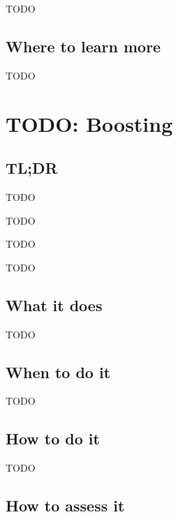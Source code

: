 \documentclass[
]{book}
\providecommand{\tightlist}{%
  \setlength{\itemsep}{0pt}\setlength{\parskip}{0pt}}
\begin{document}
TODO

\hypertarget{where-to-learn-more-17}{%
\section{Where to learn more}\label{where-to-learn-more-17}}

TODO

\hypertarget{boosting}{%
\chapter{TODO: Boosting}\label{boosting}}

\hypertarget{tldr-18}{%
\section{TL;DR}\label{tldr-18}}

\begin{description}
\tightlist
\item[What it does]
TODO
\item[When to do it]
TODO
\item[How to do it]
TODO
\item[How to assess it]
TODO
\end{description}

\hypertarget{what-it-does-18}{%
\section{What it does}\label{what-it-does-18}}

TODO

\hypertarget{when-to-do-it-18}{%
\section{When to do it}\label{when-to-do-it-18}}

TODO

\hypertarget{how-to-do-it-18}{%
\section{How to do it}\label{how-to-do-it-18}}

TODO

\hypertarget{how-to-assess-it-18}{%
\section{How to assess it}\label{how-to-assess-it-18}}
\end{document}
